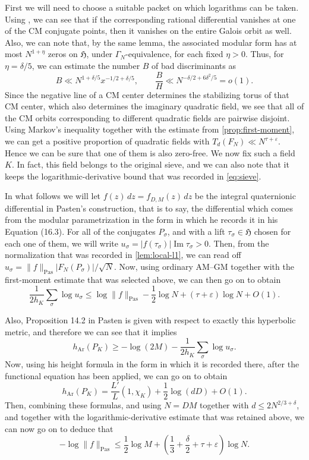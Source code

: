 \documentclass[11pt,reqno]{amsart}
\theoremstyle{definition}
\newcommand{\Hh}{\mathfrak H}
\newcommand{\eps}{\varepsilon}
\begin{document}
First we will need to choose a suitable packet on which logarithms can be taken.  Using \cite[Lemma 14.3]{Pasten}, we can see that if the corresponding rational
differential vanishes at one of the CM conjugate points, then it vanishes on
the entire Galois orbit as well.  Also, we can note that, by the same lemma, the associated modular form has at
most $N^{1+\eta}$
zeros on $\Hh$, under $\Gamma_N$-equivalence, for each fixed $\eta>0$.  Thus, for $\eta=\delta/5$, we can estimate the number $B$ of bad discriminants
as
\[
 B\ll N^{1+\delta/5}x^{-1/2+\delta/5},
 \qquad
 \frac BH\ll N^{-\delta/2+6\delta^2/5}=o(1).
\]
Since the negative line of a CM center determines the stabilizing torus of
that CM center, which also determines the imaginary quadratic field, we see
that all of the CM orbits corresponding to different quadratic fields are pairwise
disjoint. Using Markov's inequality together with the estimate from
\cref{prop:first-moment}, we can get a positive proportion of quadratic fields
with $T_d(F_N)\ll N^{\tau+\eps}$. Hence we can be sure that one of them is also zero-free. We now fix
such a field $K$. 
In fact, this field belongs to the original sieve, and we can also note that it
keeps the logarithmic-derivative bound that was recorded in \eqref{eq:sieve}.

In what follows we will let $f(z)\,dz=f_{D,M}(z)\,dz$ be the integral
quaternionic differential in Pasten's construction, that is to say, the
differential which comes from the modular parametrization in the form in which
he records it in his Equation (16.3). 
For all of the conjugates $P_\sigma$, and with a lift $\tau_\sigma\in\Hh$ chosen
for each one of them, we will write
$u_\sigma=|f(\tau_\sigma)|\operatorname{Im}\tau_\sigma>0$.
Then, from the normalization that was recorded in \cref{lem:local-l1}, we can
read off $u_\sigma=\|f\|_{\mathrm{Pas}}|F_N(P_\sigma)|/\sqrt N$.
Now, using ordinary AM--GM together with the first-moment estimate that was
selected above, we can then go on to obtain
\begin{equation}\label{eq:amgm}
 \frac1{2h_K}\sum_\sigma\log u_\sigma
 \leq \log\|f\|_{\mathrm{Pas}}-\frac12\log N
 +(\tau+\eps)\log N+O(1).
\end{equation}

Also, Proposition 14.2 in Pasten is given with respect to exactly this
hyperbolic metric, and therefore we can see that it implies
\[
 h_{\mathrm{Ar}}(P_K)\geq-\log(2M)
 -\frac1{2h_K}\sum_\sigma\log u_\sigma.
\]
Now, using his height formula \cite[Theorem 13.2]{Pasten} in the form in which
it is recorded there, after the functional equation has been applied, we can go
on to obtain
\[
 h_{\mathrm{Ar}}(P_K)
 =\frac{L'}L(1,\chi_K)+\frac12\log(dD)+O(1).
\]
Then, combining these formulas, and using $N=DM$ together with
$d\leq2N^{2/3+\delta}$, and together with the logarithmic-derivative estimate
that was retained above, we can now go on to deduce that
\begin{equation}\label{eq:petersson}
 -\log\|f\|_{\mathrm{Pas}}
 \leq\frac12\log M+
 \left(\frac13+\frac\delta2+\tau+\eps\right)\log N.
\end{equation}
\end{document}
